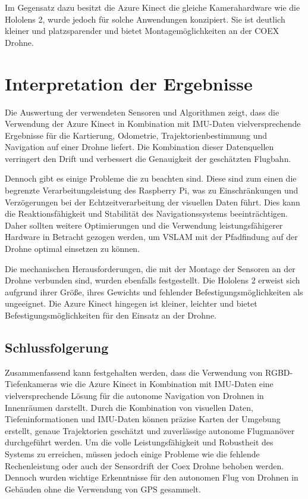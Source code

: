 Im Gegensatz dazu besitzt die Azure Kinect die gleiche Kamerahardware wie die Hololens 2, wurde jedoch für solche Anwendungen konzipiert. Sie ist deutlich kleiner und platzsparender und bietet Montagemöglichkeiten an der COEX Drohne. 

\section{Interpretation der Ergebnisse}

Die Auswertung der verwendeten Sensoren und Algorithmen zeigt, dass die Verwendung der Azure Kinect in Kombination mit \ac{IMU}-Daten vielversprechende Ergebnisse für die Kartierung, Odometrie, Trajektorienbestimmung und Navigation auf einer Drohne liefert. Die Kombination dieser Datenquellen verringert den Drift und verbessert die Genauigkeit der geschätzten Flugbahn.

Dennoch gibt es einige Probleme die zu beachten sind. Diese sind zum einen die begrenzte Verarbeitungsleistung des Raspberry Pi, was zu Einschränkungen und Verzögerungen bei der Echtzeitverarbeitung der visuellen Daten führt. Dies kann die Reaktionsfähigkeit und Stabilität des Navigationssystems beeinträchtigen. Daher sollten weitere Optimierungen und die Verwendung leistungsfähigerer Hardware in Betracht gezogen werden, um \ac{VSLAM} mit der Pfadfindung auf der Drohne optimal einsetzen zu können.

Die mechanischen Herausforderungen, die mit der Montage der Sensoren an der Drohne verbunden sind, wurden ebenfalls festgestellt. Die Hololens 2 erweist sich aufgrund ihrer Größe, ihres Gewichts und fehlender Befestigungsmöglichkeiten als ungeeignet. Die Azure Kinect hingegen ist kleiner, leichter und bietet Befestigungsmöglichkeiten für den Einsatz an der Drohne.

\subsection{Schlussfolgerung}
Zusammenfassend kann festgehalten werden, dass die Verwendung von RGBD-Tiefenkameras wie die Azure Kinect in Kombination mit \ac{IMU}-Daten eine vielversprechende Lösung für die autonome Navigation von Drohnen in Innenräumen darstellt. Durch die Kombination von visuellen Daten, Tiefeninformationen und \ac{IMU}-Daten können präzise Karten der Umgebung erstellt, genaue Trajektorien geschätzt und zuverlässige autonome Flugmanöver durchgeführt werden. Um die volle Leistungsfähigkeit und Robustheit des Systems zu erreichen, müssen jedoch einige Probleme wie die fehlende Rechenleistung oder auch der Sensordrift der Coex Drohne behoben werden. \\
Dennoch wurden wichtige Erkenntnisse für den autonomen Flug von Drohnen in Gebäuden ohne die Verwendung von \ac{GPS} gesammelt.



